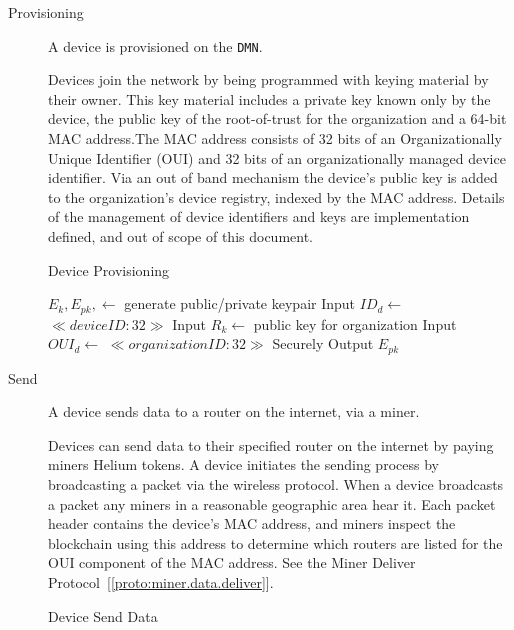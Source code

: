 \documentclass[10pt, nonatbib, nocopyrightspace, reprint]{sigplanconf}
\begin{document}
\begin{description}
  \item [Provisioning] A device is provisioned on the \verb|DMN|.

    Devices join the network by being programmed with keying material by their owner. This key material includes a private key known only by the device, the public key of the root-of-trust for the organization and a 64-bit MAC address.The MAC address consists of 32 bits of an Organizationally Unique Identifier (OUI) and 32 bits of an organizationally managed device identifier. Via an out of band mechanism the device's public key is added to the organization's device registry, indexed by the MAC address. Details of the management of device identifiers and keys are implementation defined, and out of scope of this document.

    \begin{algorithm}[!htb]
      \DontPrintSemicolon
      \caption{Device Provisioning}\label{proto:device.provision}

       {
        $E_k, E_{pk}, \leftarrow $ generate public/private keypair \;
        Input ${ID}_d \leftarrow $ $ \ll device ID:32 \gg $ \;
        Input $R_k \leftarrow $ public key for organization \;
        Input ${OUI}_d \leftarrow $ $ \ll organization ID:32 \gg $ \;
        \BlankLine
        Securely  \;
        \BlankLine
        Output $E_{pk}$ \;
      }
    \end{algorithm}
    \FloatBarrier

  \item [Send] A device sends data to a router on the internet, via a miner.

    Devices can send data to their specified router on the internet by paying miners Helium tokens.
    A device initiates the sending process by broadcasting a packet via the wireless protocol. When a device broadcasts a packet any miners in a reasonable geographic area hear it. Each packet header contains the device's MAC address, and miners inspect the blockchain using this address to determine which routers are listed for the OUI component of the MAC address. See the Miner Deliver Protocol~[\ref{proto:miner.data.deliver}].

    \begin{algorithm}[!htb]
      \DontPrintSemicolon
      \caption{Device Send Data}\label{proto:device.data.send}


\end{algorithm}
\end{description}
\end{document}
